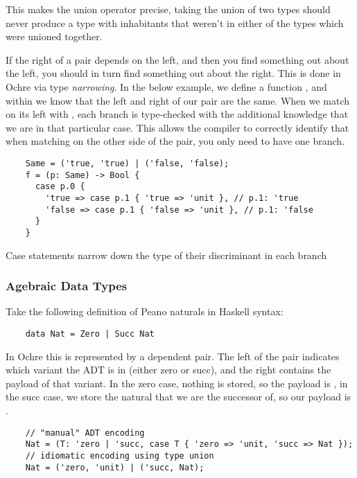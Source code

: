 \documentclass[12pt,twoside]{report}
\begin{document}
This makes the union operator precise, taking the union of two types should never produce a type with inhabitants that weren't in either of the types which were unioned together.

If the right of a pair depends on the left, and then you find something out about the left, you should in turn find something out about the right. This is done in Ochre via type \textit{narrowing}. In the below example, we define a function , and within  we know that the left and right of our pair  are the same. When we match on its left with , each branch is type-checked with the additional knowledge that we are in that particular case. This allows the compiler to correctly identify that when matching on the other side of the pair, you only need to have one branch.

\begin{listing}[H]
  \begin{verbatim}
    Same = ('true, 'true) | ('false, 'false);
    f = (p: Same) -> Bool {
      case p.0 {
        'true => case p.1 { 'true => 'unit }, // p.1: 'true
        'false => case p.1 { 'false => 'unit }, // p.1: 'false
      }
    }
  \end{verbatim}
  \caption{Case statements narrow down the type of their discriminant in each branch}
\end{listing}

\subsubsection{Agebraic Data Types}

Take the following definition of Peano naturals in Haskell syntax:

\begin{listing}[H]
  \begin{verbatim}
    data Nat = Zero | Succ Nat
  \end{verbatim}
\end{listing}

In Ochre this is represented by a dependent pair. The left of the pair indicates which variant the ADT is in (either zero or succ), and the right contains the payload of that variant. In the zero case, nothing is stored, so the payload is , in the succ case, we store the natural that we are the successor of, so our payload is .

\begin{listing}[H]
  \begin{verbatim}
    // "manual" ADT encoding
    Nat = (T: 'zero | 'succ, case T { 'zero => 'unit, 'succ => Nat });
    // idiomatic encoding using type union
    Nat = ('zero, 'unit) | ('succ, Nat);
  \end{verbatim}
\end{listing}
\end{document}

